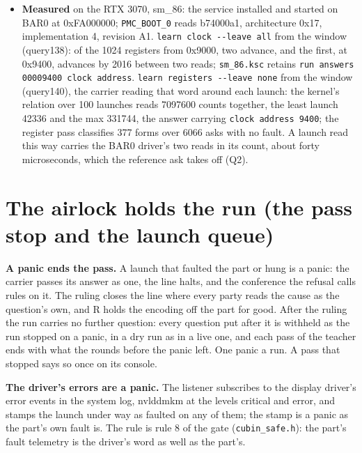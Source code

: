 \begin{itemize}
\item \textbf{Measured} on the RTX 3070, sm\_\allowbreak{}86: the service installed and started on BAR0 at 0xFA000000; \texttt{PMC\_\allowbreak{}BOOT\_\allowbreak{}0} reads b74000a1, architecture 0x17, implementation 4, revision A1. \texttt{learn clock -\allowbreak{}-\allowbreak{}leave all} from the window (query138): of the 1024 registers from 0x9000, two advance, and the first, at 0x9400, advances by 2016 between two reads; \texttt{sm\_\allowbreak{}86.\allowbreak{}ksc} retains \texttt{run answers 00009400 clock address}. \texttt{learn registers -\allowbreak{}-\allowbreak{}leave none} from the window (query140), the carrier reading that word around each launch: the kernel's relation over 100 launches reads 7097600 counts together, the least launch 42336 and the max 331744, the answer carrying \texttt{clock address 9400}; the register pass classifies 377 forms over 6066 asks with no fault. A launch read this way carries the BAR0 driver's two reads in its count, about forty microseconds, which the reference ask takes off (Q2).
\end{itemize}

\section{\texorpdfstring{The airlock holds the run (the pass stop and the launch queue)}{The airlock holds the run (the pass stop and the launch queue)}}

\textbf{A panic ends the pass.} A launch that faulted the part or hung is a panic: the carrier passes its answer as one, the line halts, and the conference the refusal calls rules on it. The ruling closes the line where every party reads the cause as the question's own, and R holds the encoding off the part for good. After the ruling the run carries no further question: every question put after it is withheld as the run stopped on a panic, in a dry run as in a live one, and each pass of the teacher ends with what the rounds before the panic left. One panic a run. A pass that stopped says so once on its console.

\textbf{The driver's errors are a panic.} The listener subscribes to the display driver's error events in the system log, nvlddmkm at the levels critical and error, and stamps the launch under way as faulted on any of them; the stamp is a panic as the part's own fault is. The rule is rule 8 of the gate (\texttt{cubin\_\allowbreak{}safe.\allowbreak{}h}): the part's fault telemetry is the driver's word as well as the part's.

